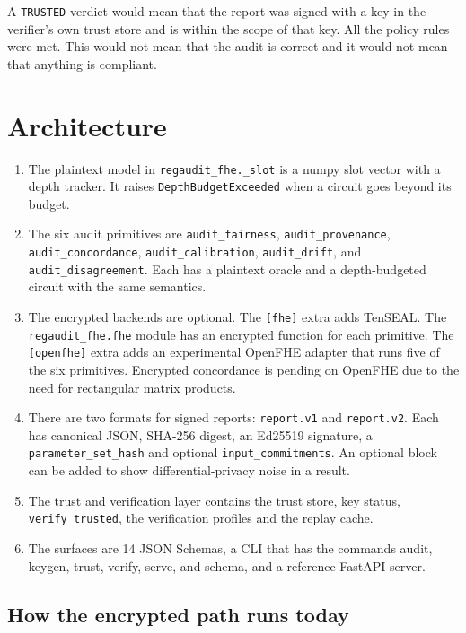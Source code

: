 \documentclass[10pt,a4paper]{article}
\begin{document}
A \texttt{TRUSTED} verdict would mean that the report was signed with a key in the verifier's own trust store and is within the scope of that key. All the policy rules were met. This would not mean that the audit is correct and it would not mean that anything is compliant.

\section{Architecture}

\begin{enumerate}[leftmargin=*]
  \item The plaintext model in \texttt{regaudit\_fhe.\_slot} is a numpy slot vector with a depth tracker. It raises \texttt{DepthBudgetExceeded} when a circuit goes beyond its budget.
  \item The six audit primitives are \texttt{audit\_fairness}, \texttt{audit\_provenance}, \texttt{audit\_concordance}, \texttt{audit\_calibration}, \texttt{audit\_drift}, and \texttt{audit\_disagreement}. Each has a plaintext oracle and a depth-budgeted circuit with the same semantics.
  \item The encrypted backends are optional. The \texttt{[fhe]} extra adds TenSEAL. The \texttt{regaudit\_fhe.fhe} module has an encrypted function for each primitive. The \texttt{[openfhe]} extra adds an experimental OpenFHE adapter that runs five of the six primitives. Encrypted concordance is pending on OpenFHE due to the need for rectangular matrix products.
  \item There are two formats for signed reports: \texttt{report.v1} and \texttt{report.v2}. Each has canonical JSON, SHA-256 digest, an Ed25519 signature, a \texttt{parameter\_set\_hash} and optional \texttt{input\_commitments}. An optional block can be added to show differential-privacy noise in a result.
  \item The trust and verification layer contains the trust store, key status, \texttt{verify\_trusted}, the verification profiles and the replay cache.
  \item The surfaces are 14 JSON Schemas, a CLI that has the commands audit, keygen, trust, verify, serve, and schema, and a reference FastAPI server.
\end{enumerate}

\subsection{How the encrypted path runs today}
\end{document}
